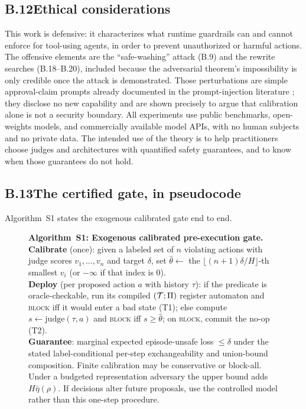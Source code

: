 \subsection*{B.12\quad Ethical considerations}
This work is defensive: it characterizes what runtime guardrails can and cannot
enforce for tool-using agents, in order to prevent unauthorized or harmful actions.
The offensive elements are the ``safe-washing'' attack (B.9) and the rewrite searches (B.18--B.20), included because the
adversarial theorem's impossibility is only credible once the attack is demonstrated.
Those perturbations are simple approval-claim prompts already documented in the
prompt-injection literature \citep{maloyan2025judge}; they disclose no new
capability and are shown precisely to argue that calibration alone is not a security
boundary. All experiments use public benchmarks, open-weights models, and commercially
available model APIs, with no human subjects and no private data. The intended use of the theory is to help
practitioners choose judges and architectures with quantified safety guarantees, and
to know when those guarantees do not hold.

\subsection*{B.13\quad The certified gate, in pseudocode}
Algorithm~S1 states the exogenous calibrated gate end to end.

\begin{figure}[t]
\begin{minipage}{\columnwidth}\small
\textbf{Algorithm~S1: Exogenous calibrated pre-execution gate.}\\
\textbf{Calibrate} (once): given a labeled set of $n$ violating actions with judge
scores $v_1,\dots,v_n$ and target $\delta$, set
$\hat\theta\leftarrow$ the $\lfloor(n{+}1)\delta/H\rfloor$-th smallest $v_i$
(or $-\infty$ if that index is $0$).\\
\textbf{Deploy} (per proposed action $a$ with history $\tau$): if the predicate is
oracle-checkable, run its compiled $(\mathcal{T};\Pi)$ register automaton and \textsc{block} iff it would enter a
bad state (T1); else compute $s\leftarrow\mathrm{judge}(\tau,a)$ and \textsc{block}
iff $s\ge\hat\theta$; on \textsc{block}, commit the no-op (T2). \\
\textbf{Guarantee}: marginal expected episode-unsafe loss $\le\delta$ under
the stated label-conditional per-step exchangeability and union-bound
composition. Finite calibration may be conservative or block-all. Under a
budgeted representation adversary the upper bound adds
$H\bar\eta(\rho)$. If decisions alter future proposals, use the controlled
model rather than this one-step procedure.
\end{minipage}
\end{figure}

